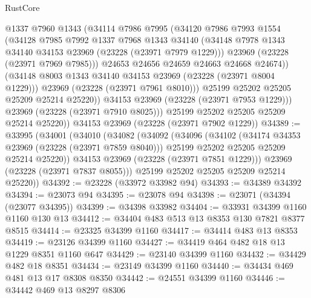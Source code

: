 \begin{lexlean}{RustCore}
\begin{coremodule}
                  @1337
                  @7960
                  @1343
                  (@34114
                    @7986
                    @7995
                    (@34120
                      @7986
                      @7993
                      @1554
                      (@34128
                        @7985
                        @7992
                        @1337
                        @7968
                        @1343
                        @34140
                        (@34148 @7978 @1343 @34140 @34153 @23969 (@23228 (@23971 @7979 @1229)))
                        @23969
                        (@23228 (@23971 @7969 @7985)))
                      @24653
                      @24656
                      @24659
                      @24663
                      @24668
                      @24674))
                  (@34148 @8003 @1343 @34140 @34153 @23969 (@23228 (@23971 @8004 @1229)))
                  @23969
                  (@23228 (@23971 @7961 @8010)))
                @25199
                @25202
                @25205
                @25209
                @25214
                @25220))
            @34153
            @23969
            (@23228 (@23971 @7953 @1229)))
          @23969
          (@23228 (@23971 @7910 @8025)))
        @25199
        @25202
        @25205
        @25209
        @25214
        @25220))
    @34153
    @23969
    (@23228 (@23971 @7902 @1229))
@34389 := @33995
    (@34001
      (@34010
        (@34082
          (@34092
            (@34096
              (@34102
                (@34174 @34353 @23969 (@23228 (@23971 @7859 @8040)))
                @25199
                @25202
                @25205
                @25209
                @25214
                @25220))
            @34153
            @23969
            (@23228 (@23971 @7851 @1229)))
          @23969
          (@23228 (@23971 @7837 @8055)))
        @25199
        @25202
        @25205
        @25209
        @25214
        @25220))
@34392 := @23228 (@33972 @33982 @94)
@34393 := @34389 @34392
@34394 := @23073 @94
@34395 := @23078 @94
@34398 := @23071 (@34394 (@23077 @34395))
@34399 := @34398 @33982
@34404 := @33931 @34399 @1160 @1160 @130 @13
@34412 := @34404 @483 @513 @13 @8353 @130 @7821 @8377 @8515
@34414 := @23325 @34399 @1160
@34417 := @34414 @483 @13 @8353
@34419 := @23126 @34399 @1160
@34427 := @34419 @464 @482 @18 @13 @1229 @8351 @1160 @647
@34429 := @23140 @34399 @1160
@34432 := @34429 @482 @18 @8351
@34434 := @23149 @34399 @1160
@34440 := @34434 @469 @481 @13 @17 @8308 @8350
@34442 := @24551 @34399 @1160
@34446 := @34442 @469 @13 @8297 @8306

\end{coremodule}
\end{lexlean}
